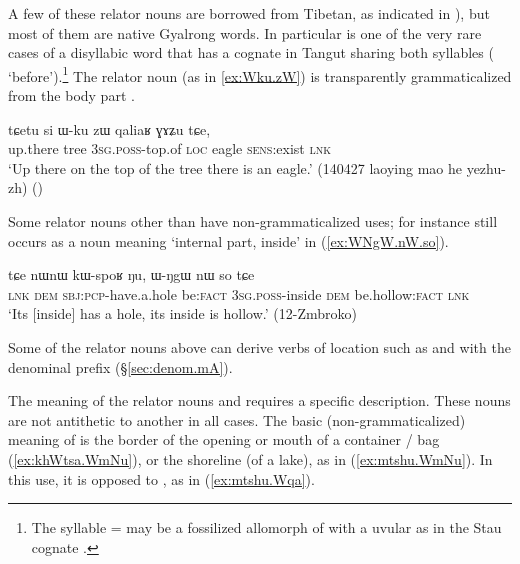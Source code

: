 A few of these relator nouns are borrowed from Tibetan, as indicated in ), but most of them are native Gyalrong words. In particular  is one of the very rare cases of a disyllabic word that has a cognate in Tangut sharing both syllables ( `before').\footnote{The syllable  =  may be a fossilized allomorph of  with a uvular as in the Stau cognate .} The relator noun  (as in \ref{ex:Wku.zW}) is transparently grammaticalized from the body part .

\begin{exe}
\ex \label{ex:Wku.zW}
 \gll tɕetu si ɯ-ku zɯ qaliaʁ ɣɤʑu tɕe, \\
 up.there tree \textsc{3sg}.\textsc{poss}-top.of \textsc{loc} eagle \textsc{sens}:exist \textsc{lnk} \\
 \glt `Up there on the top of the tree there is an eagle.' (140427 laoying mao he yezhu-zh)
()
\end{exe}

Some relator nouns other than  have non-grammaticalized uses; for instance  still occurs as a noun meaning  `internal part, inside' in (\ref{ex:WNgW.nW.so}).

\begin{exe}
\ex \label{ex:WNgW.nW.so}
 \gll tɕe nɯnɯ kɯ-spoʁ ŋu, ɯ-ŋgɯ nɯ so tɕe  \\
 \textsc{lnk} \textsc{dem} \textsc{sbj}:\textsc{pcp}-have.a.hole be:\textsc{fact} \textsc{3sg}.\textsc{poss}-inside \textsc{dem} be.hollow:\textsc{fact} \textsc{lnk} \\
 \glt `Its [inside] has a hole, its inside is hollow.' (12-Zmbroko)
\end{exe}

Some of the relator nouns above can derive verbs of location such as  and  with the denominal prefix  (§\ref{sec:denom.mA}).

The meaning of the relator nouns  and  requires a specific description. These nouns are not antithetic to another in all cases. The basic (non-grammaticalized) meaning of    is the border of the opening or mouth of a container / bag (\ref{ex:khWtsa.WmNu}), or the shoreline (of a lake), as in (\ref{ex:mtshu.WmNu}). In this use, it is opposed to , as in (\ref{ex:mtshu.Wqa}).


